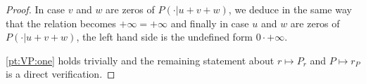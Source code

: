 \documentclass[10pt,a4paper]{amsart}
\begin{document}
\begin{proof}
In case $v$ and $w$ are zeros of $P(\cdot|u+v+w)$, we deduce in the same way that the relation becomes $+\infty=+\infty$ and finally in case $u$ and $w$ are zeros of $P(\cdot|u+v+w)$, the left hand side is the undefined form $0\cdot+\infty$.

\ref{pt:VP:one} holds trivially and the remaining statement about $r\mapsto P_r$ and $P\mapsto r_P$ is a direct verification.
\end{proof}
\end{document}
